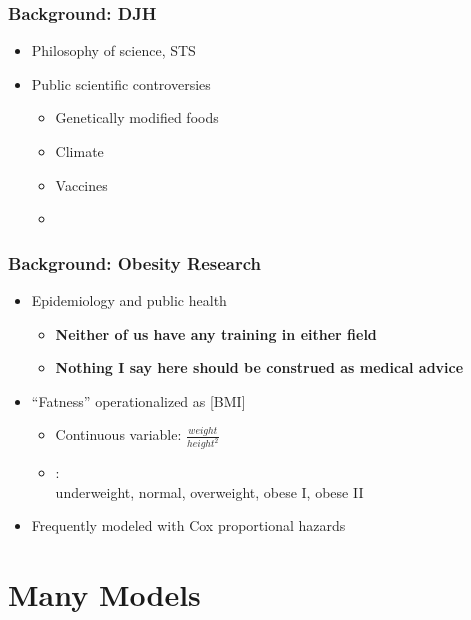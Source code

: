 \documentclass{philslides}
\begin{document}
\frame
{
	\frametitle{Background:  DJH}
	\begin{itemize}
	\item Philosophy of science, STS
	\item Public scientific controversies
		\begin{itemize}
		\item Genetically modified foods \autocite{Hicks2015, Hicks2016a, Hicks2017b}
		\item Climate \autocite{Hicks2017a}
		\item Vaccines \autocite{Hicks2017a}
		\item {}
		 \end{itemize}
	\end{itemize}
}
\frame
{
	\frametitle{Background: Obesity Research}
	\begin{itemize}
	\item Epidemiology and public health
		\begin{itemize}
		\item \textbf{Neither of us have any training in either field}
		\item \textbf{Nothing I say here should be construed as medical advice}
		\end{itemize}
	\item ``Fatness'' operationalized as  [BMI]
		\begin{itemize}
		\item Continuous variable:  $\displaystyle \frac{weight}{height^2}$
		\item {}:\\
			underweight, normal, overweight, obese I, obese II
		\end{itemize}
	\item Frequently modeled with Cox proportional hazards
	\end{itemize}
}



\section{Many Models}
\end{document}
